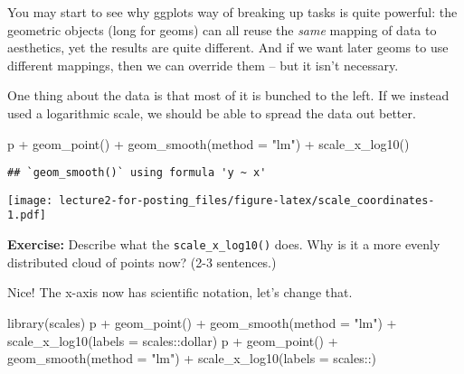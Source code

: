 \documentclass[
]{article}
\newenvironment{Shaded}{\begin{snugshade}}{\end{snugshade}}
\newcommand{\AttributeTok}[1]{\textcolor[rgb]{0.77,0.63,0.00}{#1}}
\newcommand{\FunctionTok}[1]{\textcolor[rgb]{0.00,0.00,0.00}{#1}}
\newcommand{\NormalTok}[1]{#1}
\newcommand{\SpecialCharTok}[1]{\textcolor[rgb]{0.00,0.00,0.00}{#1}}
\newcommand{\StringTok}[1]{\textcolor[rgb]{0.31,0.60,0.02}{#1}}
\begin{document}
You may start to see why ggplots way of breaking up tasks is quite
powerful: the geometric objects (long for geoms) can all reuse the
\emph{same} mapping of data to aesthetics, yet the results are quite
different. And if we want later geoms to use different mappings, then we
can override them -- but it isn't necessary.

One thing about the data is that most of it is bunched to the left. If
we instead used a logarithmic scale, we should be able to spread the
data out better.

\begin{Shaded}
\begin{Highlighting}[]
\NormalTok{p }\SpecialCharTok{+} \FunctionTok{geom\_point}\NormalTok{() }\SpecialCharTok{+} \FunctionTok{geom\_smooth}\NormalTok{(}\AttributeTok{method =} \StringTok{"lm"}\NormalTok{) }\SpecialCharTok{+} \FunctionTok{scale\_x\_log10}\NormalTok{()}
\end{Highlighting}
\end{Shaded}

\begin{verbatim}
## `geom_smooth()` using formula 'y ~ x'
\end{verbatim}

\texttt{[image: lecture2-for-posting\_files/figure-latex/scale\_coordinates-1.pdf]}

\textbf{Exercise:} Describe what the \texttt{scale\_x\_log10()} does.
Why is it a more evenly distributed cloud of points now? (2-3
sentences.)

Nice! The x-axis now has scientific notation, let's change that.

\begin{Shaded}
\begin{Highlighting}[]
\FunctionTok{library}\NormalTok{(scales)}
\NormalTok{p }\SpecialCharTok{+} \FunctionTok{geom\_point}\NormalTok{() }\SpecialCharTok{+} 
  \FunctionTok{geom\_smooth}\NormalTok{(}\AttributeTok{method =} \StringTok{"lm"}\NormalTok{) }\SpecialCharTok{+} 
  \FunctionTok{scale\_x\_log10}\NormalTok{(}\AttributeTok{labels =}\NormalTok{ scales}\SpecialCharTok{::}\NormalTok{dollar)}
\NormalTok{p }\SpecialCharTok{+} \FunctionTok{geom\_point}\NormalTok{() }\SpecialCharTok{+} 
  \FunctionTok{geom\_smooth}\NormalTok{(}\AttributeTok{method =} \StringTok{"lm"}\NormalTok{) }\SpecialCharTok{+} 
  \FunctionTok{scale\_x\_log10}\NormalTok{(}\AttributeTok{labels =}\NormalTok{ scales}\SpecialCharTok{::}\NormalTok{)}
\end{Highlighting}
\end{Shaded}
\end{document}
